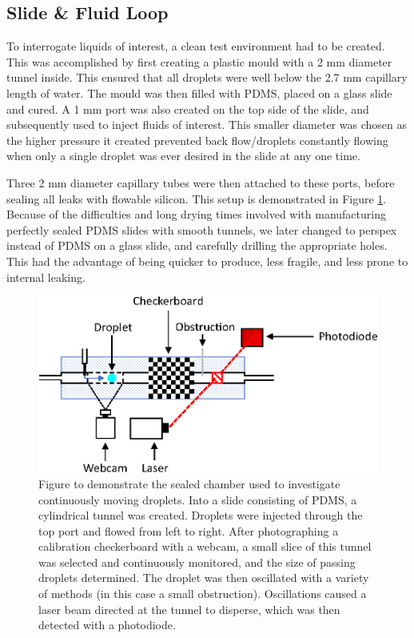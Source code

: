\documentclass{physics_article_B}
\begin{document}
    \subsection{Slide \& Fluid Loop\label{sect:method:slide}}
    
        To interrogate liquids of interest, a clean test environment had to be created. This was accomplished by first creating a plastic mould with a 2 mm diameter tunnel inside. This ensured that all droplets were well below the 2.7 mm capillary length of water\cite{capillary}. The mould was then filled with PDMS, placed on a glass slide and cured. A 1 mm port was also created on the top side of the slide, and subsequently used to inject fluids of interest. This smaller diameter was chosen as the higher pressure it created prevented back flow/droplets constantly flowing when only a single droplet was ever desired in the slide at any one time.
        
        Three 2 mm diameter capillary tubes were then attached to these ports, before sealing all leaks with flowable silicon. This setup is demonstrated in Figure \ref{fig:slide}. Because of the difficulties and long drying times involved with manufacturing perfectly sealed PDMS slides with smooth tunnels, we later changed to perspex instead of PDMS on a glass slide, and carefully drilling the appropriate holes. This had the advantage of being quicker to produce, less fragile, and less prone to internal leaking. 
        
            \begin{figure}[H]
                \centering
                    \hspace*{2.4cm}\includegraphics[scale=0.9]{Figures/Control.eps}
                    \caption{Figure to demonstrate the sealed chamber used to investigate continuously moving droplets. Into a slide consisting of PDMS, a cylindrical tunnel was created. Droplets were injected through the top port and flowed from left to right. After photographing a calibration checkerboard with a webcam, a small slice of this tunnel was selected and continuously monitored, and the size of passing droplets determined. The droplet was then oscillated with a variety of methods (in this case a small obstruction). Oscillations caused a laser beam directed at the tunnel to disperse, which was then detected with a photodiode.} 
                \label{fig:slide}
            \end{figure} 
    
\end{document}

